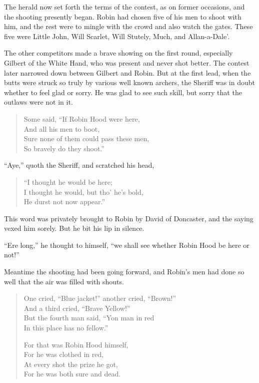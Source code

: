 The herald now set forth the terms of the contest, as on former
occasions, and the shooting presently began. Robin had chosen five of
his men to shoot with him, and the rest were to mingle with the crowd
and also watch the gates. These five were Little John, Will Scarlet,
Will Stutely, Much, and Allan-a-Dale'.

The other competitors made a brave showing on the first round,
especially Gilbert of the White Hand, who was present and never shot
better. The contest later narrowed down between Gilbert and Robin. But
at the first lead, when the butts were struck so truly by various well
known archers, the Sheriff was in doubt whether to feel glad or sorry.
He was glad to see such skill, but sorry that the outlaws were not in
it.

\begin{quote}
Some said, ``If Robin Hood were here,\\
And all his men to boot,\\
Sure none of them could pass these men,\\
So bravely do they shoot.''
\end{quote}

``Aye,'' quoth the Sheriff, and scratched his head,

\begin{quote}
``I thought he would be here;\\
I thought he would, but tho' he's bold,\\
He durst not now appear.''
\end{quote}

This word was privately brought to Robin by David of Doncaster, and the
saying vexed him sorely. But he bit his lip in silence.

``Ere long,'' he thought to himself, ``we shall see whether Robin Hood
be here or not!''

Meantime the shooting had been going forward, and Robin's men had done
so well that the air was filled with shouts.

\begin{quote}
One cried, ``Blue jacket!'' another cried, ``Brown!''\\
And a third cried, ``Brave Yellow!''\\
But the fourth man said, ``Yon man in red\\
In this place has no fellow.''

For that was Robin Hood himself,\\
For he was clothed in red,\\
At every shot the prize he got,\\
For he was both sure and dead.
\end{quote}

